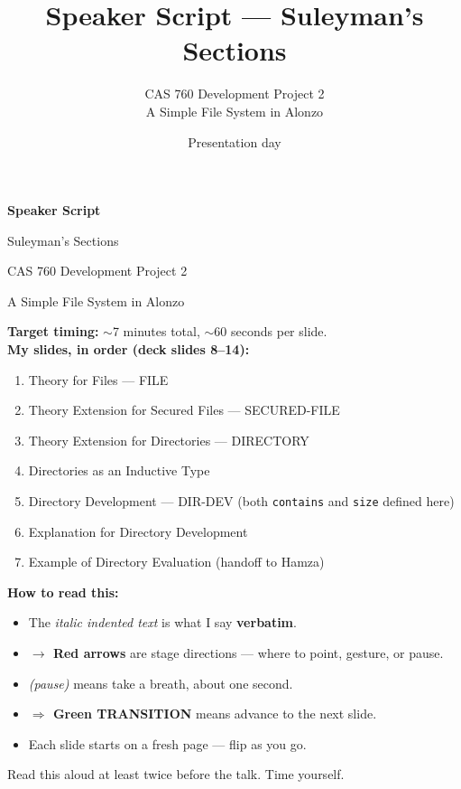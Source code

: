 \documentclass[12pt]{article}
\title{Speaker Script --- Suleyman's Sections}
\author{CAS 760 Development Project 2 \\ A Simple File System in Alonzo}
\date{Presentation day}
\begin{document}
\begin{titlepage}
\centering
\vspace*{3cm}

{\Huge\bfseries Speaker Script}\par
\vspace{0.5em}
{\Large Suleyman's Sections}\par
\vspace{2em}
{\large CAS 760 Development Project 2}\par
{\large A Simple File System in Alonzo}\par
\vspace{4em}

\begin{minipage}{0.75\textwidth}
\textbf{Target timing:} $\sim$7 minutes total, $\sim$60 seconds per slide.\\[0.6em]
\textbf{My slides, in order (deck slides 8--14):}
\begin{enumerate}[leftmargin=2em,itemsep=0.2em]
  \item Theory for Files --- \textsc{FILE}
  \item Theory Extension for Secured Files --- \textsc{SECURED-FILE}
  \item Theory Extension for Directories --- \textsc{DIRECTORY}
  \item Directories as an Inductive Type
  \item Directory Development --- \textsc{DIR-DEV} (both \texttt{contains} and \texttt{size} defined here)
  \item Explanation for Directory Development
  \item Example of Directory Evaluation (handoff to Hamza)
\end{enumerate}

\vspace{1.5em}
\textbf{How to read this:}
\begin{itemize}[leftmargin=1.5em,itemsep=0.2em]
  \item The \textit{italic indented text} is what I say \textbf{verbatim}.
  \item {\color{action}\textbf{$\rightarrow$ Red arrows}} are stage directions --- where to point, gesture, or pause.
  \item {\color{pauseclr}\textit{(pause)}} means take a breath, about one second.
  \item {\color{transition}\textbf{$\Rightarrow$ Green TRANSITION}} means advance to the next slide.
  \item Each slide starts on a fresh page --- flip as you go.
\end{itemize}
\end{minipage}

\vfill
{\footnotesize\color{pauseclr} Read this aloud at least twice before the talk. Time yourself.}
\end{titlepage}
\end{document}
